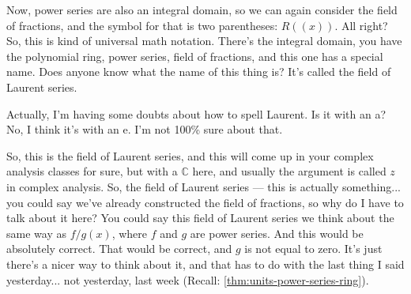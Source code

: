 \begin{speech}[00:08:35 - 00:10:15]
Now, power series are also an integral domain, so we can again consider the field of fractions, and the symbol for that is two parentheses: $R((x))$.  All right? So, this is kind of universal math notation. There's the integral domain, you have the polynomial ring, power series, field of fractions, and this one has a special name. Does anyone know what the name of this thing is? It's called the field of Laurent series. 

Actually, I'm having some doubts about how to spell Laurent. Is it with an a? No, I think it's with an e. I'm not 100\% sure about that. 

So, this is the field of Laurent series, and this will come up in your complex analysis classes for sure, but with a $\mathbb{C}$ here, and usually the argument is called $z$ in complex analysis. So, the field of Laurent series --- this is actually something... you could say we've already constructed the field of fractions, so why do I have to talk about it here? You could say this field of Laurent series we think about the same way as $f/g(x)$, where $f$ and $g$ are power series.  And this would be absolutely correct. That would be correct, and $g$ is not equal to zero. It's just there's a nicer way to think about it, and that has to do with the last thing I said yesterday... not yesterday, last week (Recall: \cref{thm:units-power-series-ring}).
\end{speech}

\begin{content}
\end{content}

